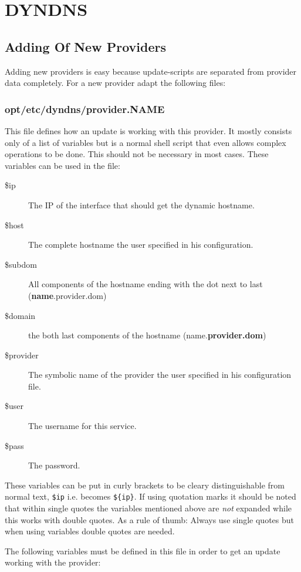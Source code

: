 \section{DYNDNS}
\subsection{Adding Of New Providers}

Adding new providers is easy because update-scripts are separated
from provider data completely. For a new provider
adapt the following files:

\subsubsection{opt/etc/dyndns/provider.NAME}

This file defines how an update is working with this provider. It mostly 
consists only of a list of variables but is a normal shell script that even 
allows complex operations to be done. This should not be necessary in most 
cases. These variables can be used in the file:

\begin{description}
\item[\$ip] The IP of the interface that should get the dynamic hostname.
\item[\$host] The complete hostname the user specified in his configuration.
\item[\$subdom] All components of the hostname ending with the dot next to last
	(\textbf{name}.provider.dom)
\item[\$domain] the both last components of the hostname
	(name.\textbf{provider.dom})
\item[\$provider] The symbolic name of the provider the user specified in his configuration file.
\item[\$user] The username for this service.
\item[\$pass] The password.
\end{description}

These variables can be put in curly brackets to be cleary distinguishable 
from normal text, \texttt{\$ip} i.e. becomes \texttt{\$\{ip\}}. 
If using quotation marks it should be noted that
within single quotes the variables mentioned above
are \emph{not} expanded while this works with double quotes.
As a rule of thumb: Always use single quotes but when using 
variables double quotes are needed.

The following variables must be defined in this file in order 
to get an update working with the provider:

